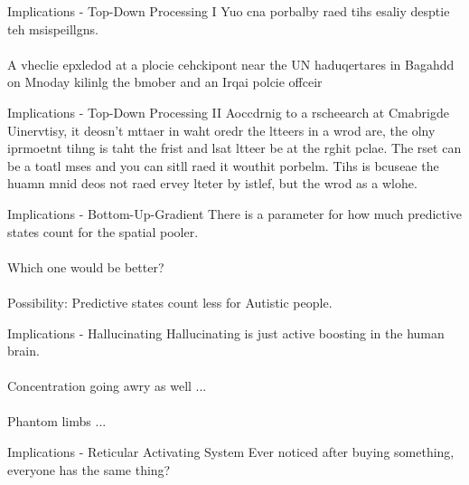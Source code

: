 \begin{frame}[c]{Implications - Top-Down Processing I}
    \Large
    Yuo cna porbalby raed tihs esaliy desptie teh msispeillgns. \\ \\
    \pause
    A vheclie epxledod at a plocie cehckipont near the UN haduqertares in Bagahdd on Mnoday kilinlg the bmober and an Irqai polcie offceir
\end{frame}


\begin{frame}[c]{Implications - Top-Down Processing II}
    \Large
    Aoccdrnig to a rscheearch at Cmabrigde Uinervtisy, it deosn’t mttaer in waht oredr the ltteers in a wrod are, the olny iprmoetnt tihng is taht the frist and lsat ltteer be at the rghit pclae. The rset can be a toatl mses and you can sitll raed it wouthit porbelm. Tihs is bcuseae the huamn mnid deos not raed ervey lteter by istlef, but the wrod as a wlohe.
\end{frame}


\begin{frame}[c]{Implications - Bottom-Up-Gradient}
    \Large
    There is a parameter for how much predictive states count for the spatial pooler. \\ \\
    \pause
    Which one would be better? \\ \\
    \pause
    Possibility: Predictive states count less for Autistic people.
\end{frame}


\begin{frame}[c]{Implications - Hallucinating}
    \Large
    Hallucinating is just active boosting in the human brain. \\ \\
    \pause
    Concentration going awry as well ... \\ \\
    \pause
    Phantom limbs ...
\end{frame}


\begin{frame}[c]{Implications - Reticular Activating System}
    \Large
    Ever noticed after buying something, \\
    everyone has the same thing?
\end{frame}


